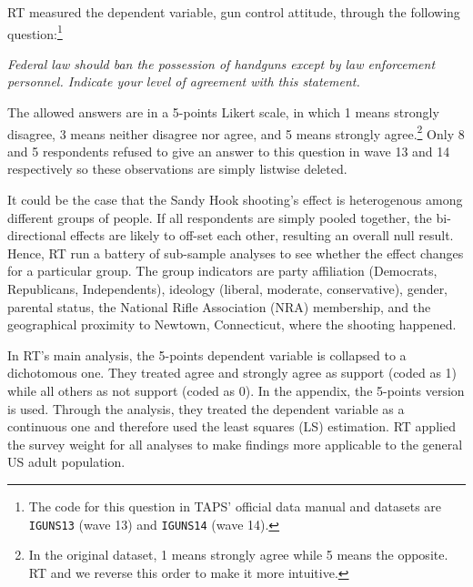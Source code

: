 \documentclass[11pt]{article}
\begin{document}
RT measured the dependent variable, gun control attitude, through the following question:\footnote{The code for this question in TAPS’ official data manual and datasets are \texttt{IGUNS13} (wave 13) and \texttt{IGUNS14} (wave 14).} 
\begin{displayquote}
\itshape
Federal law should ban the possession of handguns except by law enforcement personnel. Indicate your level of agreement with this statement.
\end{displayquote}
The allowed answers are in a 5-points Likert scale, in which 1 means strongly disagree, 3 means neither disagree nor agree, and 5 means strongly agree.\footnote{In the original dataset, 1 means strongly agree while 5 means the opposite. RT and we reverse this order to make it more intuitive.} Only 8 and 5 respondents refused to give an answer to this question in wave 13 and 14 respectively so these observations are simply listwise deleted.

It could be the case that the Sandy Hook shooting’s effect is heterogenous among different groups of people. If all respondents are simply pooled together, the bi-directional effects are likely to off-set each other, resulting an overall null result. Hence, RT run a battery of sub-sample analyses to see whether the effect changes for a particular group. The group indicators are party affiliation (Democrats, Republicans, Independents), ideology (liberal, moderate, conservative), gender, parental status, the National Rifle Association (NRA) membership, and the geographical proximity to Newtown, Connecticut, where the shooting happened.  

In RT’s main analysis, the 5-points dependent variable is collapsed to a dichotomous one. They treated agree and strongly agree as support (coded as 1) while all others as not support (coded as 0). In the appendix, the 5-points version is used. Through the analysis, they treated the dependent variable as a continuous one and therefore used the least squares (LS) estimation. RT applied the survey weight for all analyses to make findings more applicable to the general US adult population.
\end{document}
